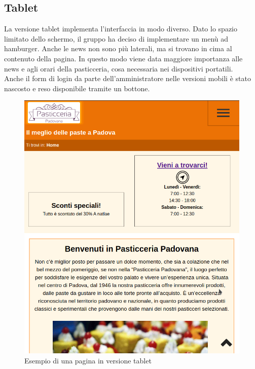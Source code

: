 \subsection{Tablet}
La versione tablet implementa l'interfaccia in modo diverso. Dato lo spazio limitato dello schermo, il gruppo ha deciso di implementare
un menù ad hamburger. Anche le news non sono più laterali, ma si trovano in cima al contenuto della pagina. In questo modo viene data
maggiore importanza alle news e agli orari della pasticceria, cosa necessaria nei dispositivi portatili.\\
Anche il form di login da parte dell'amministratore nelle versioni mobili è stato nascosto e reso disponibile tramite un bottone.
\begin{figure}[!h]		
    \centering		  
	\includegraphics[width=1\linewidth]{sezioni/Progettazione/Immagini/tablet_example.png}
	\caption{Esempio di una pagina in versione tablet}
	\label{Fig:verMobile}
\end{figure}	    


